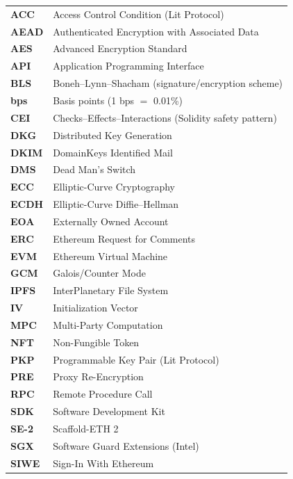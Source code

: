 \notations

\begin{longtable}{p{3.2cm} p{11cm}}
\textbf{ACC}      & Access Control Condition (Lit Protocol) \\
\textbf{AEAD}     & Authenticated Encryption with Associated Data \\
\textbf{AES}      & Advanced Encryption Standard \\
\textbf{API}      & Application Programming Interface \\
\textbf{BLS}      & Boneh--Lynn--Shacham (signature/encryption scheme) \\
\textbf{bps}      & Basis points (1 bps $=$ 0.01\%) \\
\textbf{CEI}      & Checks--Effects--Interactions (Solidity safety pattern) \\
\textbf{DKG}      & Distributed Key Generation \\
\textbf{DKIM}     & DomainKeys Identified Mail \\
\textbf{DMS}      & Dead Man's Switch \\
\textbf{ECC}      & Elliptic-Curve Cryptography \\
\textbf{ECDH}     & Elliptic-Curve Diffie--Hellman \\
\textbf{EOA}      & Externally Owned Account \\
\textbf{ERC}      & Ethereum Request for Comments \\
\textbf{EVM}      & Ethereum Virtual Machine \\
\textbf{GCM}      & Galois/Counter Mode \\
\textbf{IPFS}     & InterPlanetary File System \\
\textbf{IV}       & Initialization Vector \\
\textbf{MPC}      & Multi-Party Computation \\
\textbf{NFT}      & Non-Fungible Token \\
\textbf{PKP}      & Programmable Key Pair (Lit Protocol) \\
\textbf{PRE}      & Proxy Re-Encryption \\
\textbf{RPC}      & Remote Procedure Call \\
\textbf{SDK}      & Software Development Kit \\
\textbf{SE-2}     & Scaffold-ETH 2 \\
\textbf{SGX}      & Software Guard Extensions (Intel) \\
\textbf{SIWE}     & Sign-In With Ethereum \\

\end{longtable}

